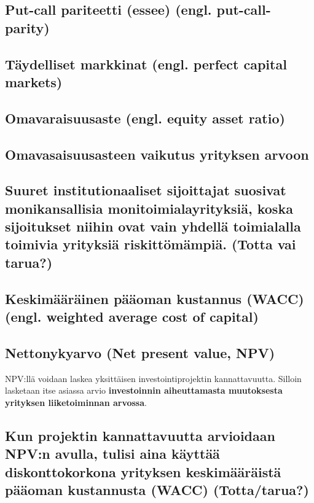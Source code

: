 \documentclass[a4paper]{article}
\begin{document}
\subsection{Put-call pariteetti (essee) (engl. put-call-parity)}

\subsection{Täydelliset markkinat (engl. perfect capital markets)}

\subsection{Omavaraisuusaste (engl. equity asset ratio)}

\subsection{Omavasaisuusasteen vaikutus yrityksen arvoon}

\subsection{Suuret institutionaaliset sijoittajat suosivat monikansallisia monitoimialayrityksiä, koska sijoitukset niihin ovat vain yhdellä toimialalla toimivia yrityksiä riskittömämpiä. (Totta vai tarua?)}

\subsection{Keskimääräinen pääoman kustannus (WACC) (engl. weighted average cost of capital)}

\subsection{Nettonykyarvo (Net present value, NPV)}

NPV:llä voidaan laskea yksittäisen investointiprojektin kannattavuutta. Silloin lasketaan itse asiassa arvio \textbf{investoinnin aiheuttamasta muutoksesta yrityksen liiketoiminnan arvossa}. 

\subsection{Kun projektin kannattavuutta arvioidaan NPV:n avulla, tulisi aina käyttää diskonttokorkona yrityksen keskimääräistä pääoman kustannusta (WACC) (Totta/tarua?)}
\end{document}
